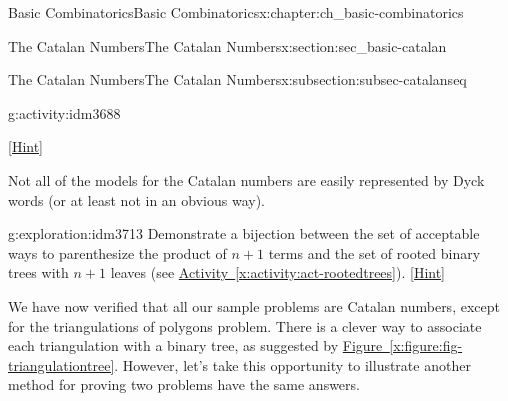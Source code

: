 \documentclass[oneside,10pt,]{book}
\numberwithin{equation}{chapter}
\def\fivegon{%
    \coordinate (a) at (0,2.5);
    \coordinate (b) at (2,1.4);
    \coordinate (c) at (1,0);
    \coordinate (d) at (-.5,0);
    \coordinate (e) at (-2,1.5);
    \draw (a) -- (b) -- (c) -- (d) -- (e) -- (a);
  }
\newcommand{\vtx}[2]{node[fill,circle,inner sep=0pt, minimum size=4pt,label=#1:#2]{}}
\newcommand{\vr}[1]{\vtx{right}{#1}}
\newcommand{\vl}[1]{\vtx{left}{#1}}
\renewcommand{\v}{\vtx{above}{}}
\begin{document}
\begin{chapterptx}{Basic Combinatorics}{}{Basic Combinatorics}{}{}{x:chapter:ch_basic-combinatorics}
\begin{sectionptx}{The Catalan Numbers}{}{The Catalan Numbers}{}{}{x:section:sec_basic-catalan}
\begin{subsectionptx}{The Catalan Numbers}{}{The Catalan Numbers}{}{}{x:subsection:subsec-catalanseq}
\begin{activity}{}{g:activity:idm3688}
\begin{enumerate}[font=\bfseries,label=(\alph*),ref=\alph*]
\space\hspace*{0pt}\hfill{\tiny\hyperlink{g:hint:idm3704-back}{[Hint]}}\end{enumerate}
\end{activity}
Not all of the models for the Catalan numbers are easily represented by Dyck words (or at least not in an obvious way).%
\begin{exploration}{}{g:exploration:idm3713}%
Demonstrate a bijection between the set of acceptable ways to parenthesize the product of \(n+1\) terms and the set of rooted binary trees with \(n+1\) leaves (see \hyperref[x:activity:act-rootedtrees]{Activity~\ref{x:activity:act-rootedtrees}}).%
\space\hspace*{0pt}\hfill{\tiny\hyperlink{g:hint:idm3719-back}{[Hint]}}\end{exploration}
We have now verified that all our sample problems are Catalan numbers, except for the triangulations of polygons problem.  There is a clever way to associate each triangulation with a binary tree, as suggested by \hyperref[x:figure:fig-triangulationtree]{Figure~\ref{x:figure:fig-triangulationtree}}.  However, let's take this opportunity to illustrate another method for proving two problems have the same answers.%
\begin{figure}
\centering
\begin{sidebyside}{2}{0.125}{0.125}{0.25}%
\begin{sbspanel}{0.25}%

        \end{sbspanel}%
\begin{sbspanel}{0.25}%


\end{sbspanel}
\end{sidebyside}
\end{figure}
\end{subsectionptx}
\end{sectionptx}
\end{chapterptx}
\end{document}
